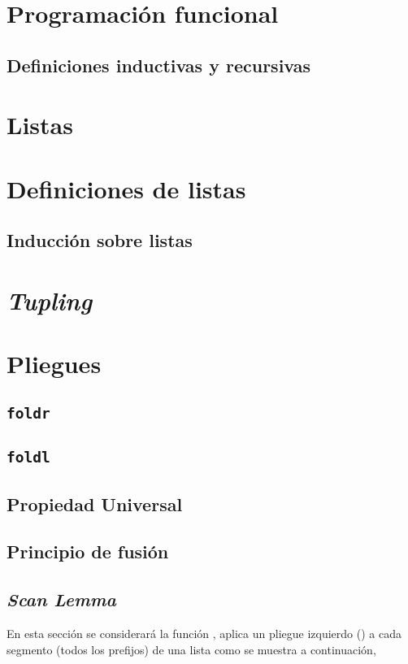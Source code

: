 \section{Programación funcional}
\subsection{Definiciones inductivas y recursivas}

\section{Listas}
\section{Definiciones de listas}
\subsection{Inducción sobre listas}
\section{\textit{Tupling}}

\section{Pliegues}
\subsection{\texttt{foldr}}
\subsection{\texttt{foldl}}
\subsection{Propiedad Universal}
\subsection{Principio de fusión}
\subsection{\textit{Scan Lemma}}\label{fundamentos:scan_lemma}
En esta sección se considerará la función ,  aplica un pliegue
izquierdo () a cada segmento (todos los prefijos) de una lista como se muestra
a continuación,

